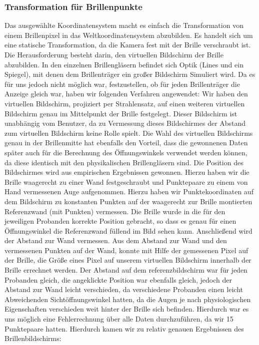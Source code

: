 \subsubsection{Transformation für Brillenpunkte}
Das ausgewählte Koordinatensystem macht es einfach die Transformation von einem Brillenpixel in das Weltkoordinatensystem abzubilden. Es handelt sich um eine statische Transformation, da die Kamera fest mit der Brille verschraubt ist. Die Herausforderung besteht darin, den virtuellen Bildschirm der Brille abzubilden. In den einzelnen Brillengläsern befindet sich Optik (Lines und ein Spiegel), mit denen dem Brillenträger ein großer Bildschirm Simuliert wird. Da es für uns jedoch nicht möglich war, festzustellen, ob für jeden Brillenträger die Anzeige gleich war, haben wir folgenden Verfahren angewendet: Wir haben den virtuellen Bildschirm, projiziert per Strahlensatz, auf einen weiteren virtuellen Bildschirm genau im Mittelpunkt der Brille festgelegt. Dieser Bildschirm ist unabhängig vom Benutzer, da zu Vermessung dieses Bildschirmes der Abstand zum virtuellen Bildschirm keine Rolle spielt.
Die Wahl des virtuellen Bildschirms genau in der Brillenmitte hat ebenfalls den Vorteil, dass die gewonnenen Daten später auch für die Berechnung des Öffnungswinkels verwendet werden können, da diese identisch mit den physikalischen Brillengläsern sind.
Die Position des Bildschirmes wird aus empirischen Ergebnissen gewonnen. Hierzu haben wir die Brille waagerecht zu einer Wand festgeschraubt und Punktepaare zu einem von Hand vermessenen Auge aufgenommen. Hierzu haben wir Punktekoordinaten auf dem Bildschirm zu konstanten Punkten auf der waagerecht zur Brille montierten Referenzwand (mit Punkten) vermessen. Die Brille wurde in die für den jeweiligen Probanden korrekte Position gebracht, so dass es genau für einen Öffnungswinkel die Referenzwand füllend im Bild sehen kann. Anschließend wird der Abstand zur Wand vermessen. Aus dem Abstand zur Wand und den vermessenen Punkten auf der Wand, konnte mit Hilfe der gemessenen Pixel auf der Brille, die Größe eines Pixel auf unserem virtuellen Bildschirm innerhalb der Brille errechnet werden. Der Abstand auf dem referenzbildschirm war für jeden Probanden gleich, die angeklickte Position war ebenfalls gleich, jedoch der Abstand zur Wand leicht verschieden, da verschiedene Probanden einen leicht Abweichenden Sichtöffnungswinkel hatten, da die Augen je nach physiologischen Eigenschaften verschieden weit hinter der Brille sich befinden. Hierdurch war es uns möglich eine Fehlerrechnung über alle Daten durchzuführen, da wir 15 Punktepaare hatten. Hierdurch kamen wir zu relativ genauen Ergebnissen des Brillenbildschirms:

